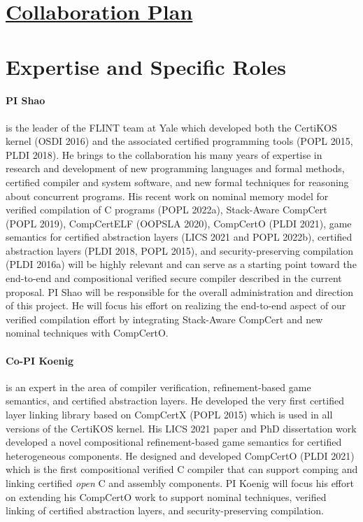 \documentclass[11pt]{article}
\begin{document}
\thispagestyle{empty}
\section*{\underline{Collaboration Plan}}
\section{Expertise and Specific Roles}

\paragraph{PI Shao} is the leader of the FLINT team at Yale
which developed both the CertiKOS kernel (OSDI 2016) and the
associated certified programming tools (POPL 2015, PLDI
2018).  He brings to the collaboration his many years of expertise in
research and development of new programming languages and formal
methods, certified compiler and system software, and new formal
techniques for reasoning about concurrent programs. His recent work on
nominal memory model for verified compilation of C programs (POPL
2022a), Stack-Aware CompCert (POPL 2019), CompCertELF (OOPSLA 2020),
CompCertO (PLDI 2021), game semantics for certified abstraction layers
(LICS 2021 and POPL 2022b), certified abstraction layers (PLDI 2018,
POPL 2015), and security-preserving compilation (PLDI 2016a) will be
highly relevant and can serve as a starting point toward the
end-to-end and compositional verified secure compiler described in
the current proposal. PI Shao will be responsible for the overall
administration and direction of this project. He will focus his
effort on realizing the end-to-end aspect of our verified
compilation effort by integrating Stack-Aware CompCert and new nominal
techniques with CompCertO. 


\paragraph{Co-PI Koenig} is an expert in the area of compiler
verification, refinement-based game semantics, and certified
abstraction layers. He developed the very first certified layer
linking library based on CompCertX (POPL 2015) which is used in all
versions of the CertiKOS kernel. His LICS 2021 paper and PhD
dissertation work developed a novel compositional refinement-based
game semantics for certified heterogeneous components. He designed and
developed CompCertO (PLDI 2021) which is the first compositional
verified C compiler that can support comping and linking certified
{\em open} C and assembly components. PI Koenig will focus his effort
on extending his CompCertO work to support nominal techniques,
verified linking of certified abstraction layers, and
security-preserving compilation.
\end{document}
